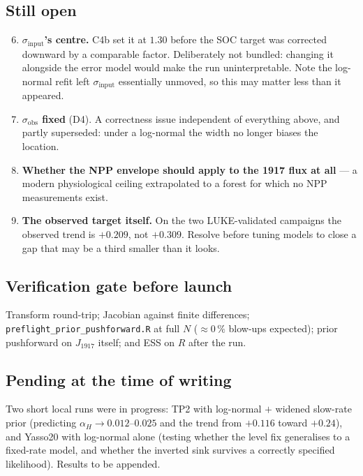\documentclass[11pt]{article}
\newcommand{\sinput}{\sigma_{\mathrm{input}}}
\newcommand{\sobs}{\sigma_{\mathrm{obs}}}
\begin{document}
\subsection*{Still open}
\begin{enumerate}\setcounter{enumi}{5}
\item \textbf{$\sinput$'s centre.} C4b set it at $1.30$ before the SOC target was corrected
      downward by a comparable factor. Deliberately not bundled: changing it alongside the
      error model would make the run uninterpretable. Note the log-normal refit left $\sinput$
      essentially unmoved, so this may matter less than it appeared.
\item \textbf{$\sobs$ fixed} (D4). A correctness issue independent of everything above, and
      partly superseded: under a log-normal the width no longer biases the location.
\item \textbf{Whether the NPP envelope should apply to the 1917 flux at all} --- a modern
      physiological ceiling extrapolated to a forest for which no NPP measurements exist.
\item \textbf{The observed target itself.} On the two LUKE-validated campaigns the observed
      trend is $+0.209$, not $+0.309$. Resolve before tuning models to close a gap that may be
      a third smaller than it looks.
\end{enumerate}

\subsection*{Verification gate before launch}
Transform round-trip; Jacobian against finite differences;
\texttt{preflight\_prior\_pushforward.R} at full $N$ ($\approx 0\,\%$ blow-ups expected); prior
pushforward on $J_{1917}$ itself; and ESS on $R$ after the run.

\subsection*{Pending at the time of writing}
Two short local runs were in progress: TP2 with log-normal $+$ widened slow-rate prior
(predicting $\alpha_H \rightarrow 0.012$--$0.025$ and the trend from $+0.116$ toward $+0.24$),
and Yasso20 with log-normal alone (testing whether the level fix generalises to a fixed-rate
model, and whether the inverted sink survives a correctly specified likelihood). Results to be
appended.
\end{document}
